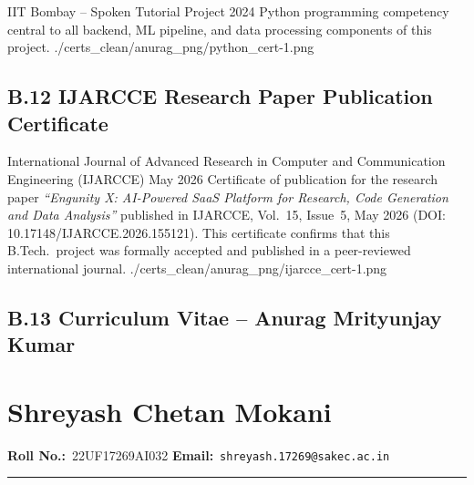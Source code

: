 \certentry
  {IIT Bombay -- Spoken Tutorial Project}
  {2024}
  {Python programming competency central to all backend, ML pipeline, and
   data processing components of this project.}
  {./certs_clean/anurag_png/python_cert-1.png}

\subsection*{B.12 \quad IJARCCE Research Paper Publication Certificate}

\certentry
  {International Journal of Advanced Research in Computer and Communication Engineering (IJARCCE)}
  {May 2026}
  {Certificate of publication for the research paper \textit{``Engunity X: AI-Powered SaaS Platform
   for Research, Code Generation and Data Analysis''} published in IJARCCE,
   Vol.~15, Issue~5, May 2026 (DOI: 10.17148/IJARCCE.2026.155121).
   This certificate confirms that this B.Tech.~project was formally accepted
   and published in a peer-reviewed international journal.}
  {./certs_clean/anurag_png/ijarcce_cert-1.png}

\clearpage
\subsection*{B.13 \quad Curriculum Vitae -- Anurag Mrityunjay Kumar}



\clearpage
\section{Shreyash Chetan Mokani}
\label{sec:certs-shreyash}

\noindent\textbf{Roll No.:}~22UF17269AI032 \qquad
\textbf{Email:}~\texttt{shreyash.17269@sakec.ac.in}

\vspace{0.4em}\noindent\rule{\linewidth}{0.4pt}\vspace{0.6em}


